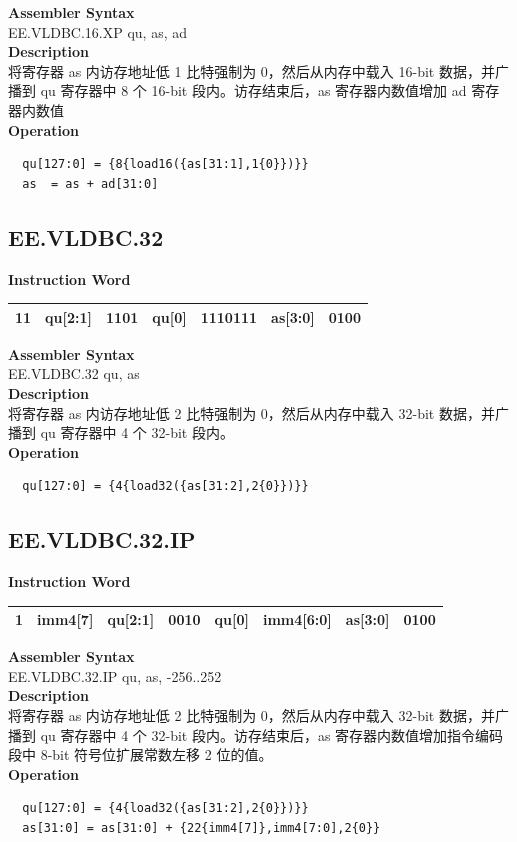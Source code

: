 \textbf{Assembler Syntax} \\
EE.VLDBC.16.XP qu, as, ad \\
\textbf{Description} \\
将寄存器 as 内访存地址低 1 比特强制为 0，然后从内存中载入 16-bit 数据，并广播到 qu 寄存器中 8 个 16-bit 段内。访存结束后，as 寄存器内数值增加 ad 寄存器内数值\\
\textbf{Operation}
\begin{lstlisting}
  qu[127:0] = {8{load16({as[31:1],1{0}})}}
  as  = as + ad[31:0]
\end{lstlisting}

\clearpage
\subsection{EE.VLDBC.32}\label{instruction:EEVLDBC32}
\setlength\tabcolsep{6pt}
\textbf{Instruction Word} \\
\begin{tabular}{|c|c|c|c|c|c|c|}
	\hline
	11 & qu[2:1] & 1101 & qu[0] & 1110111 & as[3:0] & 0100 \\
	\hline
\end{tabular}

\textbf{Assembler Syntax} \\
EE.VLDBC.32 qu, as \\
\textbf{Description} \\
将寄存器 as 内访存地址低 2 比特强制为 0，然后从内存中载入 32-bit 数据，并广播到 qu 寄存器中 4 个 32-bit 段内。\\
\textbf{Operation}
\begin{lstlisting}
  qu[127:0] = {4{load32({as[31:2],2{0}})}}
\end{lstlisting}

\clearpage
\subsection{EE.VLDBC.32.IP}\label{instruction:EEVLDBC32IP}
\setlength\tabcolsep{6pt}
\textbf{Instruction Word} \\
\begin{tabular}{|c|c|c|c|c|c|c|c|}
	\hline
	1 & imm4[7] & qu[2:1] & 0010 & qu[0] & imm4[6:0] & as[3:0] & 0100 \\
	\hline
\end{tabular}

\textbf{Assembler Syntax} \\
EE.VLDBC.32.IP qu, as, -256..252 \\
\textbf{Description} \\
将寄存器 as 内访存地址低 2 比特强制为 0，然后从内存中载入 32-bit 数据，并广播到 qu 寄存器中 4 个 32-bit 段内。访存结束后，as 寄存器内数值增加指令编码段中 8-bit 符号位扩展常数左移 2 位的值。\\
\textbf{Operation}
\begin{lstlisting}
  qu[127:0] = {4{load32({as[31:2],2{0}})}}
  as[31:0] = as[31:0] + {22{imm4[7]},imm4[7:0],2{0}}
\end{lstlisting}

